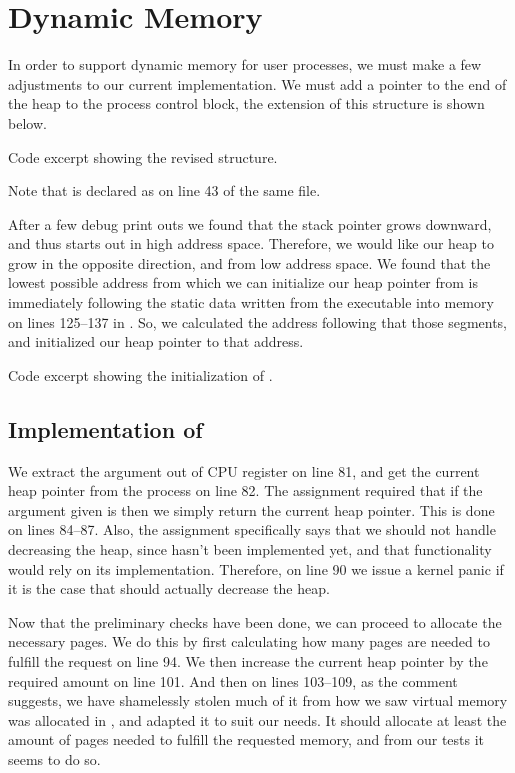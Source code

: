 %
%
%

\section{Dynamic Memory}
In order to support dynamic memory for user processes, we must make a few
adjustments to our current implementation. We must add a pointer to the end of
the heap to the process control block, the extension of this structure is
shown below.

{Code excerpt showing the revised  structure.}

Note that  is declared as  on line 43 of the
same file.

After a few debug print outs we found that the stack pointer grows downward,
and thus starts out in high address space. Therefore, we would like our heap
to grow in the opposite direction, and from low address space. We found that
the lowest possible address from which we can initialize our heap pointer from
is immediately following the static data written from the executable into
memory on lines 125--137 in . So, we calculated the
address following that those segments, and initialized our heap pointer to
that address.

{Code excerpt showing the initialization of .}

\subsection{Implementation of }
We extract the argument out of CPU register  on line 81, and get the
current heap pointer from the process on line 82. The assignment required that
if the argument given is  then we simply return the current heap
pointer. This is done on lines 84--87. Also, the assignment specifically says
that we should not handle decreasing the heap, since  hasn't
been implemented yet, and that functionality would rely on its implementation.
Therefore, on line 90 we issue a kernel panic if it is the case that
 should actually decrease the heap.

Now that the preliminary checks have been done, we can proceed to allocate the
necessary pages. We do this by first calculating how many pages are needed to
fulfill the request on line 94. We then increase the current heap pointer by
the required amount on line 101. And then on lines 103--109, as the comment
suggests, we have shamelessly stolen much of it from how we saw virtual
memory was allocated in , and adapted it to suit our
needs. It should allocate at least the amount of pages needed to fulfill the
requested memory, and from our tests it seems to do so.

